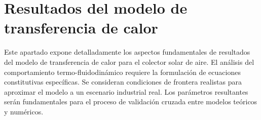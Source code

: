 \section{Resultados del modelo de transferencia de calor}
\label{sec:cap09_transferencia}

Este apartado expone detalladamente los aspectos fundamentales de resultados del modelo de transferencia de calor para el colector solar de aire.
El análisis del comportamiento termo-fluidodinámico requiere la formulación de ecuaciones constitutivas específicas.
Se consideran condiciones de frontera realistas para aproximar el modelo a un escenario industrial real.
Los parámetros resultantes serán fundamentales para el proceso de validación cruzada entre modelos teóricos y numéricos.
